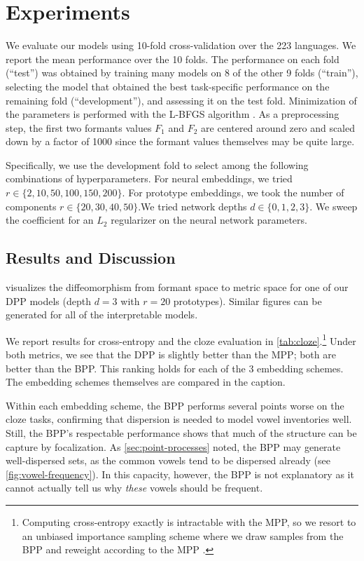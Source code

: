 \documentclass[11pt,a4paper]{article}
\renewcommand{\cite}[2][]{\citep[#1]{#2}}
\begin{document}
\section{Experiments}\label{sec:experiments}

We evaluate our models using 10-fold cross-validation over the
223 languages. We report the mean performance over the 10 folds.  The
performance on each fold (``test'') was obtained by training many
models on 8 of the other 9 folds (``train''), selecting the model that
obtained the best task-specific performance on the remaining fold
(``development''), and assessing it on the test fold. Minimization
of the parameters is performed with the L-BFGS algorithm \cite{DBLP:journals/mp/LiuN89}.
As a
preprocessing step, the first two formants values $F_1$ and $F_2$ are
centered around zero and scaled down by a factor of 1000 since the
formant values themselves may be quite large.

Specifically, we use the development fold to select among the
following combinations of hyperparameters.  For neural embeddings, we
tried $r\in \{2, 10, 50, 100, 150, 200\}$. For prototype embeddings, we
took the number of components $r \in \{20, 30, 40,
50\}$.We tried network depths $d \in
\{0, 1, 2, 3\}$.  We sweep the coefficient for an $L_2$ regularizer
on the neural network parameters.

\subsection{Results and Discussion}\label{sec:results}

 visualizes the diffeomorphism from formant
space to metric space for one of our DPP models
(depth $d=3$ with $r=20$ prototypes).  Similar figures can be generated for all
of the interpretable models.

We report results for cross-entropy and the cloze evaluation in
\cref{tab:cloze}.\footnote{Computing cross-entropy exactly is intractable with
the MPP, so we resort to an unbiased importance sampling scheme where
we draw samples from the BPP and reweight according to the MPP
\cite{liu2015estimating}.} Under both metrics, we see that the DPP
is slightly better than the MPP; both are better than the BPP. 
This ranking holds for each of the 3 embedding schemes.  The 
embedding schemes themselves are compared in the caption.

Within each embedding scheme, the BPP performs several points worse
on the cloze tasks, confirming that dispersion is needed to model vowel inventories
well. Still, the BPP's respectable performance shows that much of the 
structure can be capture by focalization.  As \cref{sec:point-processes}
noted, the BPP may generate well-dispersed sets, as the common vowels
tend to be dispersed already (see
\cref{fig:vowel-frequency}).  In this capacity, however, the BPP is
not explanatory as it cannot actually tell us why {\em these} vowels
should be frequent.
\end{document}
